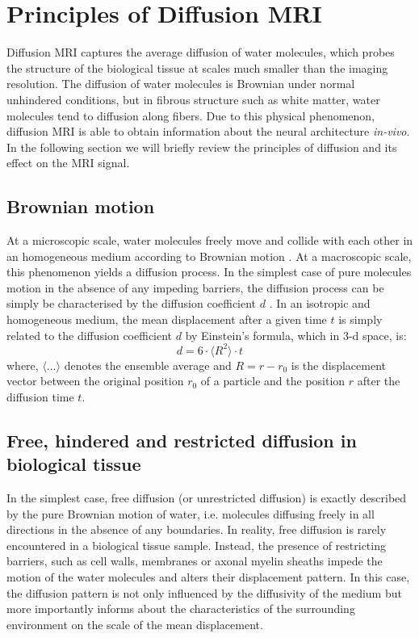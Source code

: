 \section{Principles of Diffusion MRI}
Diffusion MRI captures the average diffusion of water molecules, which probes the structure of the biological tissue at scales much smaller than the imaging resolution. The diffusion of water molecules is Brownian under normal unhindered conditions, but in fibrous structure such as white matter, water molecules tend to diffusion along fibers. Due to this physical phenomenon, diffusion MRI is able to obtain information about the neural architecture \textit{in-vivo}. In the following section we will briefly review the principles of diffusion and its effect on the MRI signal.

\subsection{Brownian motion}
At a microscopic scale, water molecules freely move and collide with each other in an homogeneous medium according to Brownian motion \citep{Brown:1828}. At a macroscopic scale, this phenomenon yields a diffusion process. In the simplest case of pure molecules motion in the absence of any impeding barriers, the diffusion process can be simply be characterised by the diffusion coefficient $d$ \citep{Fick:1855}. In an isotropic and homogeneous medium, the mean displacement after a given time $t$ is simply related to the diffusion coefficient $d$ by Einstein's formula, which in 3-d space, is: 
\begin{equation}
	 d = 6 \cdot \langle R^2 \rangle \cdot t
	\label{eq:chapter2 einsteins formula}
\end{equation}
where, $\langle\dots\rangle$ denotes the ensemble average and $R = r - r_0$ is the displacement vector between the original position $r_0$ of a particle and the position $r$ after the diffusion time $t$. 

\subsection[Types of diffusion]{Free, hindered and restricted diffusion in biological tissue}
In the simplest case, free diffusion (or unrestricted diffusion) is exactly described by the pure Brownian motion of water, i.e. molecules diffusing freely in all directions in the absence of any boundaries. In reality, free diffusion is rarely encountered in a biological tissue sample. Instead, the presence of restricting barriers, such as cell walls, membranes or axonal myelin sheaths impede the motion of the water molecules and alters their displacement pattern. In this case, the diffusion pattern is not only influenced by the diffusivity of the medium but more importantly informs about the characteristics of the surrounding environment on the scale of the mean displacement. 

